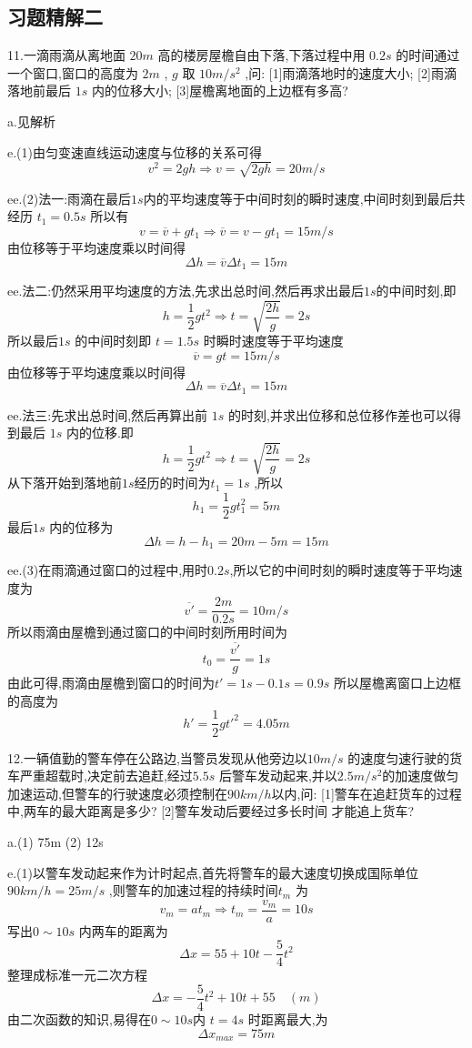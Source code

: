 \subsection{习题精解二}
\begin{calculate}
11.一滴雨滴从离地面 $20m$ 高的楼房屋檐自由下落,下落过程中用 $0.2s$ 的时间通过一个窗口,窗口的高度为 $2m$ , $g$ 取 $10m/s^2$ ,问:
[1]雨滴落地时的速度大小;
[2]雨滴落地前最后 $1s$ 内的位移大小;
[3]屋檐离地面的上边框有多高?

a.见解析

e.(1)由匀变速直线运动速度与位移的关系可得
$$v^2=2gh \Longrightarrow v=\sqrt{2gh}=20m/s$$

ee.(2)法一:雨滴在最后$1s$内的平均速度等于中间时刻的瞬时速度,中间时刻到最后共经历 $t_1=0.5s$ 所以有
$$v=\overline{v}+gt_1 \Longrightarrow \overline{v}=v-gt_1=15m/s$$
由位移等于平均速度乘以时间得
$$\Delta h=\overline{v}\Delta t_1 =15m$$

ee.法二:仍然采用平均速度的方法,先求出总时间,然后再求出最后$1s$的中间时刻,即
$$h=\frac{1}{2}gt^2 \Longrightarrow t=\sqrt{\frac{2h}{g}}=2s$$
所以最后$1s$ 的中间时刻即 $t=1.5s$ 时瞬时速度等于平均速度
$$\overline{v}=gt=15m/s$$
由位移等于平均速度乘以时间得
$$\Delta h=\overline{v}\Delta t_1 =15m$$

ee.法三:先求出总时间,然后再算出前 $1s$ 的时刻,并求出位移和总位移作差也可以得到最后 $1s$ 内的位移.即
$$h=\frac{1}{2}gt^2 \Longrightarrow t=\sqrt{\frac{2h}{g}}=2s$$
从下落开始到落地前$1s$经历的时间为$t_1=1s$ ,所以
$$h_1=\frac{1}{2}gt_1^2=5m$$
最后$1s$ 内的位移为
$$\Delta h=h-h_1=20m-5m=15m$$


ee.(3)在雨滴通过窗口的过程中,用时$0.2s$,所以它的中间时刻的瞬时速度等于平均速度为
$$\overline{v'}=\frac{2m}{0.2s}=10m/s$$
所以雨滴由屋檐到通过窗口的中间时刻所用时间为
$$t_0=\frac{\overline{v'}}{g}=1s$$
由此可得,雨滴由屋檐到窗口的时间为$t'=1s-0.1s=0.9s$ 所以屋檐离窗口上边框的高度为
$$h'=\frac{1}{2}gt'^2=4.05m$$

12.一辆值勤的警车停在公路边,当警员发现从他旁边以$10m/s$ 的速度匀速行驶的货车严重超载时,决定前去追赶,经过$5.5s$ 后警车发动起来,并以$2.5m/s^2$的加速度做匀加速运动,但警车的行驶速度必须控制在$90km/h$以内,问:
[1]警车在追赶货车的过程中,两车的最大距离是多少?
[2]警车发动后要经过多长时间 才能追上货车?

a.(1) 75m \qquad (2) 12s

e.(1)以警车发动起来作为计时起点,首先将警车的最大速度切换成国际单位 $90km/h=25m/s$ ,则警车的加速过程的持续时间$t_m$ 为
$$v_m=at_m \Longrightarrow t_m=\frac{v_m}{a}=10s$$
写出$0\sim 10s$ 内两车的距离为
$$\Delta x=55+10t -\frac{5}{4}t^2$$
整理成标准一元二次方程
$$\Delta x =-\frac{5}{4}t^2+10t+55 \quad (m)$$
由二次函数的知识,易得在$0\sim 10s$内 $t=4s$ 时距离最大,为
$$\Delta x_{max}=75m$$


\end{calculate}
